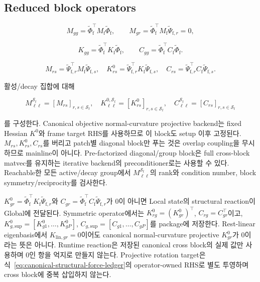 \documentclass[11pt,a4paper]{article}
\begin{document}
\subsection{Reduced block operators}

\begin{equation}
  M_{gg}=\widetilde\Phi_{\mathrm f}^\top
  M_{\mathrm f}\widetilde\Phi_{\mathrm f},
  \qquad
  M_{g r}=\widetilde\Phi_{\mathrm f}^\top
  M_{\mathrm f}\widetilde\Psi_{\mathrm f,r}=0,
\end{equation}

\begin{equation}
  K_{gg}=\widetilde\Phi_{\mathrm f}^\top
  K_{\mathrm f}\widetilde\Phi_{\mathrm f},
  \qquad
  C_{gg}=\widetilde\Phi_{\mathrm f}^\top
  C_{\mathrm f}\widetilde\Phi_{\mathrm f}.
\end{equation}

\begin{equation}
  M_{rs}=\widetilde\Psi_{\mathrm f,r}^\top
  M_{\mathrm f}\widetilde\Psi_{\mathrm f,s},
  \quad
  K_{rs}^{0}=\widetilde\Psi_{\mathrm f,r}^\top
  K_{\mathrm f}\widetilde\Psi_{\mathrm f,s},
  \quad
  C_{rs}=\widetilde\Psi_{\mathrm f,r}^\top
  C_{\mathrm f}\widetilde\Psi_{\mathrm f,s}.
  \label{eq:patch-cross-blocks}
\end{equation}

활성/decay 집합에 대해

\begin{equation}
  M_{\ell\ell}^{\mathcal S_t}=[M_{rs}]_{r,s\in\mathcal S_t},
  \quad
  K_{\ell\ell}^{0,\mathcal S_t}=[K_{rs}^{0}]_{r,s\in\mathcal S_t},
  \quad
  C_{\ell\ell}^{\mathcal S_t}=[C_{rs}]_{r,s\in\mathcal S_t}
\end{equation}

를 구성한다. Canonical objective normal-curvature projective backend는 fixed Hessian \(K^0\)와
frame target RHS를 사용하므로 이 block도 setup 이후 고정된다.
\(M_{rs},K_{rs}^0,C_{rs}\)를 버리고 patch별 diagonal block만 푸는 것은
overlap coupling을 무시하므로 mainline이 아니다.
Pre-factorized diagonal/group block은 full cross-block matvec를 유지하는 iterative backend의
preconditioner로는 사용할 수 있다.
Reachable한 모든 active/decay group에서 \(M_{\ell\ell}^{\mathcal S_t}\)의 rank와 condition number,
block symmetry/reciprocity를 검사한다.

\(K_{gr}^{0}=\widetilde\Phi_{\mathrm f}^\top
K_{\mathrm f}\widetilde\Psi_{\mathrm f,r}\)와
\(C_{gr}=\widetilde\Phi_{\mathrm f}^\top
C_{\mathrm f}\widetilde\Psi_{\mathrm f,r}\)가 0이 아니면
Local state의 structural reaction이 Global에 전달된다.
Symmetric operator에서는
\(K_{rg}^{0}=(K_{gr}^{0})^\top\),
\(C_{rg}=C_{gr}^\top\)이고,
\(K_{g,\mathrm{sup}}^{0}=[K_{g1}^{0},\ldots,K_{gP}^{0}]\),
\(C_{g,\mathrm{sup}}=[C_{g1},\ldots,C_{gP}]\)를 package에 저장한다.
Rest-linear eigenbasis에서 \(K_{\mathrm{lin},gr}=0\)이어도 canonical
normal-curvature projective \(K_{gr}^{0}\)가 0이라는 뜻은 아니다.
Runtime reaction은 저장된 canonical cross block의 실제 값만 사용하며 0인 항을 억지로 만들지 않는다.
Projective rotation target은 식~\eqref{eq:canonical-structural-force-ledger}의
operator-owned RHS로 별도 투영하며 cross block에 중복 삽입하지 않는다.
\end{document}
